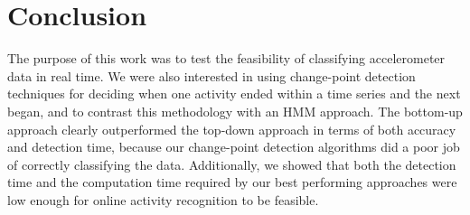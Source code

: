 \chapter{Conclusion}
The purpose of this work was to test the feasibility of classifying 
accelerometer data in real time. We were also interested in using change-point
detection techniques for deciding when one activity ended within a time series
and the next began, and to contrast this methodology with an HMM approach.
The bottom-up approach clearly outperformed the top-down approach in terms
of both accuracy and detection time, because our change-point detection
algorithms did a poor job of correctly classifying the data. Additionally, we
showed that both the detection time and the computation time required by our
best performing approaches were low enough for online activity recognition to be
feasible.
